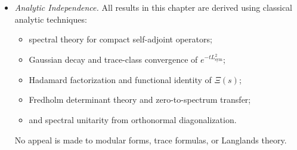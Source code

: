 \begin{itemize}
  \item \textit{Analytic Independence.}  
  All results in this chapter are derived using classical analytic techniques:
  \begin{itemize}
    \item spectral theory for compact self-adjoint operators;
    \item Gaussian decay and trace-class convergence of \( e^{-tL_{\mathrm{sym}}^2} \);
    \item Hadamard factorization and functional identity of \( \Xi(s) \);
    \item Fredholm determinant theory and zero-to-spectrum transfer;
    \item and spectral unitarity from orthonormal diagonalization.
  \end{itemize}
  No appeal is made to modular forms, trace formulas, or Langlands theory.
\end{itemize}
